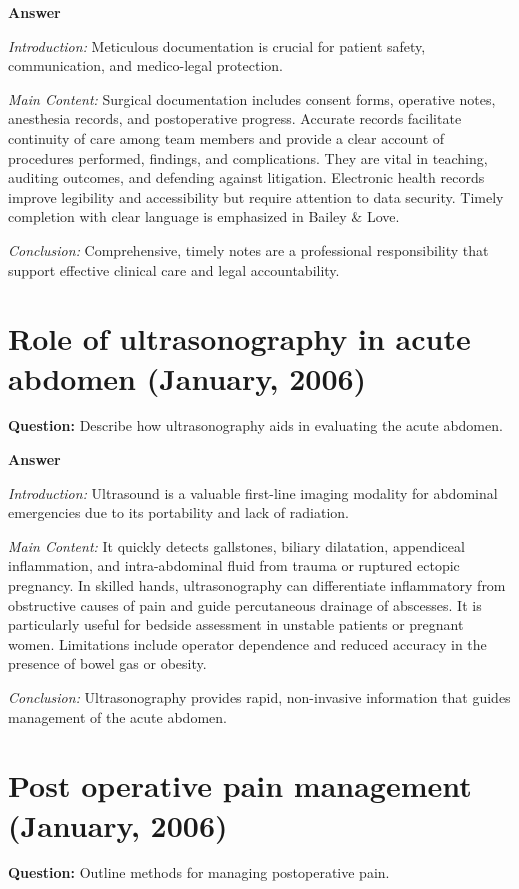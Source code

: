 \documentclass{article}
\begin{document}
\textbf{Answer}

\emph{Introduction:} Meticulous documentation is crucial for patient safety, communication, and medico-legal protection.

\emph{Main Content:} Surgical documentation includes consent forms, operative notes, anesthesia records, and postoperative progress. Accurate records facilitate continuity of care among team members and provide a clear account of procedures performed, findings, and complications. They are vital in teaching, auditing outcomes, and defending against litigation. Electronic health records improve legibility and accessibility but require attention to data security. Timely completion with clear language is emphasized in Bailey \& Love.

\emph{Conclusion:} Comprehensive, timely notes are a professional responsibility that support effective clinical care and legal accountability.


\section{Role of ultrasonography in acute abdomen (January, 2006)}


\textbf{Question:} Describe how ultrasonography aids in evaluating the acute abdomen.

\textbf{Answer}

\emph{Introduction:} Ultrasound is a valuable first-line imaging modality for abdominal emergencies due to its portability and lack of radiation.

\emph{Main Content:} It quickly detects gallstones, biliary dilatation, appendiceal inflammation, and intra-abdominal fluid from trauma or ruptured ectopic pregnancy. In skilled hands, ultrasonography can differentiate inflammatory from obstructive causes of pain and guide percutaneous drainage of abscesses. It is particularly useful for bedside assessment in unstable patients or pregnant women. Limitations include operator dependence and reduced accuracy in the presence of bowel gas or obesity.

\emph{Conclusion:} Ultrasonography provides rapid, non-invasive information that guides management of the acute abdomen.


\section{Post operative pain management (January, 2006)}


\textbf{Question:} Outline methods for managing postoperative pain.
\end{document}
